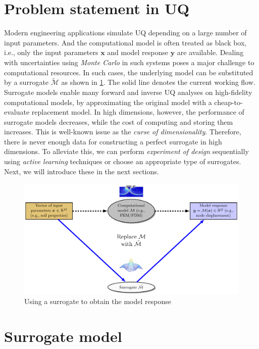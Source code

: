 \section{Problem statement in UQ}
Modern engineering applications simulate UQ depending on a large number of input parameters. And the computational model is often treated as black box, i.e., only the input parameters $\boldsymbol{x}$ and model response $\boldsymbol{y}$ are available. Dealing with uncertainties using \textit{Monte Carlo} in such systems poses a major challenge to computational resources. In such cases, the underlying model can be substituted by a surrogate $\tilde{\mathcal{M}}$ as shown in \cref{fig: UQ_surrogate}. The solid line denotes the current working flow. Surrogate models enable many forward and inverse UQ analyses on high-fidelity computational models, by approximating the original model with a cheap-to-evaluate replacement model. In high dimensions, however, the performance of surrogate models decreases, while the cost of computing and storing them increases. This is well-known issue as the \textit{curse of dimensionality}. Therefore, there is never enough data for constructing a perfect surrogate in high dimensions. To alleviate this, we can perform \textit{experiment of design} sequentially using \textit{active learning} techniques or choose an appropriate type of surrogates. Next, we will introduce these in the next sections.

\begin{figure}[htbp]
    \centering
    \includegraphics[width = 140mm]{Figures/figure-UQ_surrogate.pdf}
    \caption{Using a surrogate to obtain the model response}
    \label{fig: UQ_surrogate}
\end{figure}

\section{Surrogate model}

